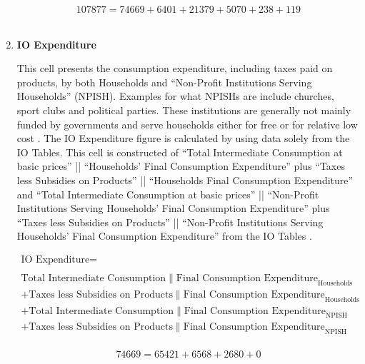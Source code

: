 \begin{enumerate}
\begin{equation} \nonumber
107877 = 74669+6401+21379+5070+238+119
\end{equation}\\

\newpage

\item \textbf {IO Expenditure}

This cell presents the consumption expenditure, including taxes paid on products, by both Households and ``Non-Profit Institutions Serving Households'' (NPISH). Examples for what NPISHs are include churches, sport clubs and political parties. These institutions are generally not mainly funded by governments and serve households either for free or for relative low cost \cite{Eurostat2013}. The IO Expenditure figure is calculated by using data solely from the IO Tables. This cell is constructed of  ``Total Intermediate Consumption at basic prices'' || ``Households' Final Consumption Expenditure'' plus ``Taxes less Subsidies on Products'' || ``Households Final Consumption Expenditure'' and ``Total Intermediate Consumption at basic prices'' || ``Non-Profit Institutions Serving Households' Final Consumption Expenditure'' plus ``Taxes less Subsidies on Products'' || ``Non-Profit Institutions Serving Households' Final Consumption Expenditure'' from the IO Tables \cite{ScotGov2013a}.

\begin{equation}
\begin{split}
\text{IO Expenditure} =  \\ \\
\text{Total Intermediate Consumption}\|\text{Final Consumption Expenditure}_\text{Households}\\
+\text{Taxes less Subsidies on Products}\|\text{Final Consumption Expenditure}_\text{Households}\\
+\text{Total Intermediate Consumption}\|\text{Final Consumption Expenditure}_\text{NPISH}\\
+\text{Taxes less Subsidies on Products}\|
\text{Final Consumption Expenditure}_\text{NPISH}
\end{split} \label{eq:2.5.15}
\end{equation}\\

\begin{equation} \nonumber
74669 = 65421+6568+2680+0
\end{equation}\\



\end{enumerate}

